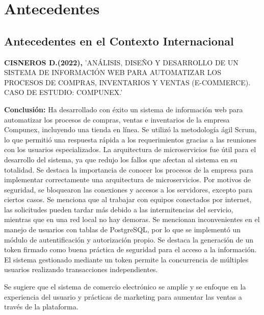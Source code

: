 \documentclass[12pt,a4paper]{article}
\newcommand{\espacio}{\par\vspace{3mm}}
\newcommand{\newsection}[1]{\section{\hspace{4mm} #1}}%
\newcommand{\newsubsection}[1]{\subsection{\hspace{4mm} #1}}
\begin{document}

\newpage
\newsection{Antecedentes }
\newsubsection{Antecedentes en el Contexto Internacional}
\textbf{CISNEROS D.(2022),}
'ANÁLISIS, DISEÑO Y DESARROLLO DE UN SISTEMA DE
INFORMACIÓN WEB PARA AUTOMATIZAR LOS PROCESOS DE
COMPRAS, INVENTARIOS Y VENTAS (E-COMMERCE).
CASO DE ESTUDIO: COMPUNEX.'
\espacio
\textbf{Conclusión: } 
Ha desarrollado con éxito un sistema de información web para automatizar los procesos de compras, ventas e inventarios de la empresa Compunex, incluyendo una tienda en línea. Se utilizó la metodología ágil Scrum, lo que permitió una respuesta rápida a los requerimientos gracias a las reuniones con los usuarios especializados. La arquitectura de microservicios fue útil para el desarrollo del sistema, ya que redujo los fallos que afectan al sistema en su totalidad. Se destaca la importancia de conocer los procesos de la empresa para implementar correctamente una arquitectura de microservicios. 
Por motivos de seguridad, se bloquearon las conexiones y accesos a los servidores, excepto para ciertos casos. Se menciona que al trabajar con equipos conectados por internet, las solicitudes pueden tardar más debido a las intermitencias del servicio, mientras que en una red local no hay demoras. Se mencionan inconvenientes en el manejo de usuarios con tablas de PostgreSQL, por lo que se implementó un módulo de autentificación y autorización propio. Se destaca la generación de un token firmado como buena práctica de seguridad para el acceso a la información. El sistema gestionado mediante un token permite la concurrencia de múltiples 
usuarios realizando transacciones independientes.
\espacio Se sugiere que el sistema de comercio electrónico se amplíe y se enfoque en la experiencia del usuario y prácticas de marketing para aumentar las ventas a través de la plataforma.
\cite{internacional}
\end{document}
